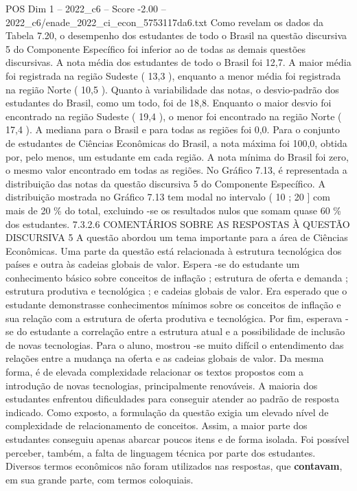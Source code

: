 \begin{textsample}{POS Dim 1 – 2022\_c6 – Score -2.00 – 2022\_c6/enade\_2022\_ci\_econ\_5753117da6.txt}
Como revelam os dados da Tabela 7.20, o desempenho dos estudantes de todo o Brasil na questão discursiva 5 do Componente Específico foi inferior ao de todas as demais questões discursivas.
A nota média dos estudantes de todo o Brasil foi 12,7.
A maior média foi registrada na região Sudeste ( 13,3 ), enquanto a menor média foi registrada na região Norte ( 10,5 ).
Quanto à variabilidade das notas, o desvio-padrão dos estudantes do Brasil, como um todo, foi de 18,8.
Enquanto o maior desvio foi encontrado na região Sudeste ( 19,4 ), o menor foi encontrado na região Norte ( 17,4 ).
A mediana para o Brasil e para todas as regiões foi 0,0.
Para o conjunto de estudantes de Ciências Econômicas do Brasil, a nota máxima foi 100,0, obtida por, pelo menos, um estudante em cada região.
A nota mínima do Brasil foi zero, o mesmo valor encontrado em todas as regiões.
No Gráfico 7.13, é representada a distribuição das notas da questão discursiva 5 do Componente Específico.
A distribuição mostrada no Gráfico 7.13 tem modal no intervalo ( 10 ; 20 ] com mais de 20 \% do total, excluindo -se os resultados nulos que somam quase 60 \% dos estudantes. 7.3.2.6 COMENTÁRIOS SOBRE AS RESPOSTAS À QUESTÃO DISCURSIVA 5 A questão abordou um tema importante para a área de Ciências Econômicas.
Uma parte da questão está relacionada à estrutura tecnológica dos países e outra às cadeias globais de valor.
Espera -se do estudante um conhecimento básico sobre conceitos de inflação ; estrutura de oferta e demanda ; estrutura produtiva e tecnológica ; e cadeias globais de valor.
Era esperado que o estudante demonstrasse conhecimentos mínimos sobre os conceitos de inflação e sua relação com a estrutura de oferta produtiva e tecnológica.
Por fim, esperava -se do estudante a correlação entre a estrutura atual e a possibilidade de inclusão de novas tecnologias.
Para o aluno, mostrou -se muito difícil o entendimento das relações entre a mudança na oferta e as cadeias globais de valor.
Da mesma forma, é de elevada complexidade relacionar os textos propostos com a introdução de novas tecnologias, principalmente renováveis.
A maioria dos estudantes enfrentou dificuldades para conseguir atender ao padrão de resposta indicado.
Como exposto, a formulação da questão exigia um elevado nível de complexidade de relacionamento de conceitos.
Assim, a maior parte dos estudantes conseguiu apenas abarcar poucos itens e de forma isolada.
Foi possível perceber, também, a falta de linguagem técnica por parte dos estudantes.
Diversos termos econômicos não foram utilizados nas respostas, que \textbf{contavam}, em sua grande parte, com termos coloquiais.

\end{textsample}

